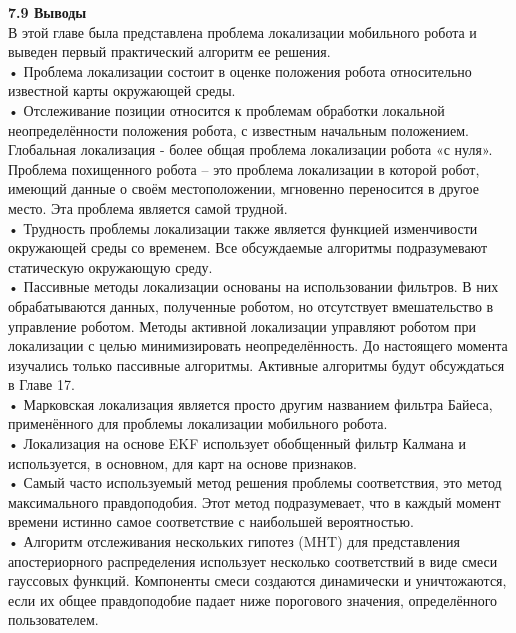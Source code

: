 \documentclass[10pt,a4paper]{article}
\begin{document}
\textbf{7.9 Выводы} \\

В этой главе была представлена проблема локализации мобильного робота и выведен первый практический алгоритм ее решения.\\

• Проблема локализации состоит в оценке положения робота относительно известной карты окружающей среды.\\

• Отслеживание позиции относится к проблемам обработки локальной неопределённости положения робота, с известным начальным положением. Глобальная локализация - более общая проблема локализации робота «с нуля». Проблема похищенного робота – это проблема локализации в которой робот, имеющий данные о своём местоположении, мгновенно переносится в другое место. Эта проблема является самой трудной. \\

• Трудность проблемы локализации также является функцией изменчивости окружающей среды со временем. Все обсуждаемые алгоритмы подразумевают статическую окружающую среду.\\

• Пассивные методы локализации основаны на использовании фильтров. В них обрабатываются данных, полученные роботом, но отсутствует вмешательство в управление роботом. Методы активной локализации управляют роботом при локализации с целью минимизировать неопределённость. До настоящего момента изучались только пассивные алгоритмы. Активные алгоритмы будут обсуждаться в Главе 17.\\

• Марковская локализация является просто другим названием фильтра Байеса, применённого для проблемы локализации мобильного робота. \\

• Локализация на основе EKF использует обобщенный фильтр Калмана и используется, в основном,  для карт на основе признаков.\\

• Самый часто используемый метод  решения проблемы соответствия, это метод максимального правдоподобия. Этот метод подразумевает, что в каждый момент времени истинно самое  соответствие с наибольшей вероятностью.\\

• Алгоритм отслеживания нескольких гипотез (MHT) для представления апостериорного распределения использует несколько соответствий в виде смеси гауссовых функций. Компоненты смеси создаются динамически и уничтожаются, если их общее правдоподобие падает ниже порогового значения, определённого пользователем. \\
\end{document}
